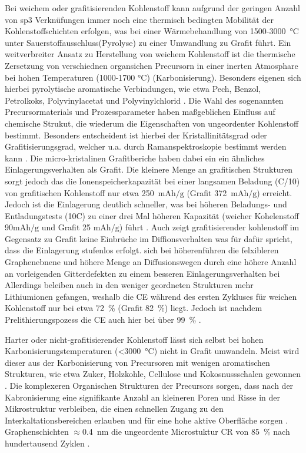 Bei weichem oder grafitisierenden Kohlenstoff kann aufgrund der geringen Anzahl von sp3 Verknüfungen immer noch eine thermisch bedingten Mobilität der Kohlenstoffschichten erfolgen, was bei einer Wärmebehandlung von 1500-3000~$\si{\degreeCelsius}$ unter Sauerstoffausschluss(Pyrolyse) zu einer Umwandlung zu Grafit führt. Ein weitverbreiter Ansatz zu Herstellung von weichem Kohlenstoff ist die thermische Zersetzung von verschiednen organsichen Precursorn in einer inerten Atmosphare bei hohen Temperaturen (1000-1700 $\si{\degreeCelsius}$) (Karbonisierung). Besonders eigenen sich hierbei pyrolytische aromatische Verbindungen, wie etwa Pech, Benzol, Petrolkoks, Polyvinylacetat und Polyvinylchlorid \cite{Wang2021}. Die Wahl des sogenannten Precursormaterials und Prozessparameter haben maßgeblichen Einfluss auf chemische Strukut, die wiederum die Eigenschaften von ungeordenter Kohlenstoff bestimmt. Besonders entscheident ist hierbei der Kristallinitätsgrad oder Grafitisierungsgrad, welcher u.a. durch Ramanspektroskopie bestimmt werden kann \cite{Yu2014}. Die micro-kristalinen Grafitberiche haben dabei ein ein ähnliches Einlagerungsverhalten als Grafit. Die kleinere Menge an grafitischen Strukturen sorgt jedoch das die Ionenspeicherkapazität bei einer langsamen Beladung (C/10) von grafitischen Kohlenstoff nur etwa 250~$\si{\mA \hour \per \g}$ (Grafit 372~$\si{\mA \hour \per \g}$) erreicht. Jedoch ist die Einlagerung deutlich schneller, was bei höheren Beladungs- und Entladungstests (10C) zu einer drei Mal höheren Kapazität (weicher Kohelenstoff 90$\si{\mA \hour \per \g}$ und Grafit 25 $\si{\mA \hour \per \g}$) führt \cite{Schroeder2014}. Auch zeigt grafitisierender kohlenstoff im Gegensatz zu Grafit keine Einbrüche im Diffionsverhalten was für dafür spricht, dass die Einlagerung stufenlos erfolgt. sich bei höherenführen die felxibleren Graphenebnene und höhere Menge an Diffusionswegen durch eine höhere Anzahl an vorleigenden Gitterdefekten zu einem besseren Einlagerungsverhalten bei  Allerdings beleiben auch in den weniger geordneten Strukturen  mehr Lithiumionen gefangen, weshalb die CE während des ersten Zykluses für weichen Kohlenstoff nur bei etwa 72~\% (Grafit 82~\%) liegt. Jedoch ist nachdem Prelithierungspozess die CE auch hier bei über 99~\% \cite{Schroeder2014}. 

Harter oder nicht-grafitisierender Kohlenstoff lässt sich selbst bei hohen Karbonisierungstemperaturen (<3000~$\si{\degreeCelsius}$) nicht in Grafit umwandeln. Meist wird dieser aus der Karbonisierung von Precursoren mit wenigen aromatischen Strukturen, wie etwa Zuker, Holzkohle, Cellulose und Kokosnussschalen gewonnen \cite{Wang2021}. Die komplexeren Organischen Strukturen der Precursors sorgen, dass nach der Kabronisierung eine signifikante Anzahl an kleineren Poren und Risse in der Mikrostruktur verbleiben, die einen schnellen Zugang zu den Interkaltationsbereichen erlauben und für eine hohe aktive Oberfläche sorgen \cite{Liu2019a}. Graphenschichten $\approx$0.4~$\si{\nm}$ die ungeordente Microstuktur 
CR von 85~\% nach hundertausend Zyklen \cite{Cao2014}.

